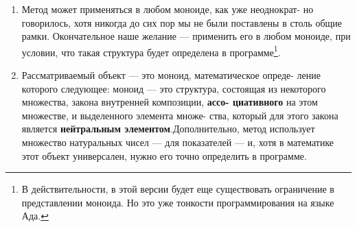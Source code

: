 \begin{enumerate}


\item Метод может применяться в любом моноиде, как уже неоднократ­-\linebreak
но говорилось, хотя никогда до сих пор мы не были поставлены в\linebreak
столь общие рамки. Окончательное наше желание — применить\linebreak
его в любом моноиде, при условии, что такая структура будет\linebreak
определена в программе\footnote{В действительности, в этой версии будет еще существовать ограничение в пред­ставлении моноида. Но это уже тонкости программирования на языке Ада.}.
\item Рассматриваемый объект — это моноид, математическое опреде­-\linebreak
ление которого следующее: моноид — это структура, состоящая\linebreak
из некоторого множества, закона внутренней композиции, {\bf ассо-\linebreak
циативного} на этом множестве, и выделенного элемента множе­-\linebreak
ства, который для этого закона является {\bf нейтральным элементом}.\linebreak Дополнительно, метод использует множество натуральных\linebreak
чисел — для показателей — и, хотя в математике этот объект\linebreak
универсален, нужно его точно определить в программе.

\newpage


\end{enumerate}

